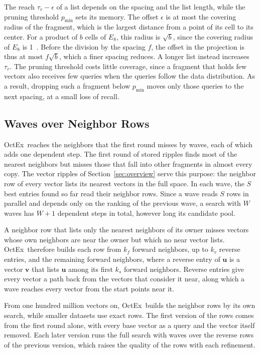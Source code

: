 \documentclass[letterpaper,twocolumn,10pt]{article}
\newcommand{\sysname}{OctEx}
\begin{document}
The reach $\tau_r - \epsilon$ of a list depends on the spacing and the list length, while the pruning threshold $p_{\min}$ sets its memory. The offset $\epsilon$ is at most the covering radius of the fragment, which is the largest distance from a point of its cell to its center. For a product of $b$ cells of $E_8$, this radius is $\sqrt{b}$, since the covering radius of $E_8$ is 1~\cite{conway1999splag}. Before the division by the spacing $f$, the offset in the projection is thus at most $f\sqrt{b}$, which a finer spacing reduces. A longer list instead increases $\tau_r$. The pruning threshold costs little coverage, since a fragment that holds few vectors also receives few queries when the queries follow the data distribution. As a result, dropping such a fragment below $p_{\min}$ moves only those queries to the next spacing, at a small loss of recall.

\subsection{Waves over Neighbor Rows}
\label{sec:waves}

\sysname\ reaches the neighbors that the first round misses by waves, each of which adds one dependent step. The first round of stored ripples finds most of the nearest neighbors but misses those that fall into other fragments in almost every copy. The vector ripples of Section~\ref{sec:overview} serve this purpose: the neighbor row of every vector lists its nearest vectors in the full space. In each wave, the $S$ best entries found so far read their neighbor rows. Since a wave reads $S$ rows in parallel and depends only on the ranking of the previous wave, a search with $W$ waves has $W + 1$ dependent steps in total, however long its candidate pool.

A neighbor row that lists only the nearest neighbors of its owner misses vectors whose own neighbors are near the owner but which no near vector lists. \sysname\ therefore builds each row from $k_f$ forward neighbors, up to $k_r$ reverse entries, and the remaining forward neighbors, where a reverse entry of $\mathbf{u}$ is a vector $\mathbf{v}$ that lists $\mathbf{u}$ among its first $k_s$ forward neighbors. Reverse entries give every vector a path back from the vectors that consider it near, along which a wave reaches every vector from the start points near it.

From one hundred million vectors on, \sysname\ builds the neighbor rows by its own search, while smaller datasets use exact rows. The first version of the rows comes from the first round alone, with every base vector as a query and the vector itself removed. Each later version runs the full search with waves over the reverse rows of the previous version, which raises the quality of the rows with each refinement.
\end{document}

